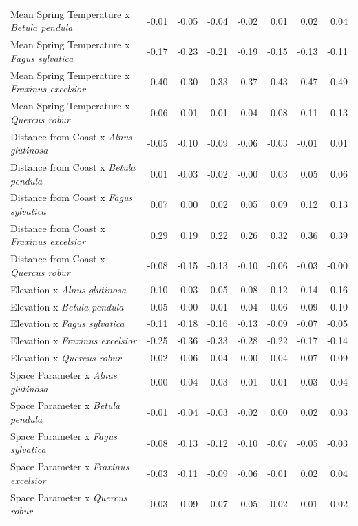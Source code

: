 \documentclass{article}\usepackage[]{graphicx}\usepackage[]{color}
\begin{document}
\begin{longtable}{lrrrrrrr}
  Mean Spring 
Temperature
x\textit{ Betula pendula} & -0.01 & -0.05 & -0.04 & -0.02 & 0.01 & 0.02 & 0.04 \\ 
  Mean Spring 
Temperature
x\textit{ Fagus sylvatica} & -0.17 & -0.23 & -0.21 & -0.19 & -0.15 & -0.13 & -0.11 \\ 
  Mean Spring 
Temperature
x\textit{ Fraxinus excelsior} & 0.40 & 0.30 & 0.33 & 0.37 & 0.43 & 0.47 & 0.49 \\ 
  Mean Spring 
Temperature
x\textit{ Quercus robur} & 0.06 & -0.01 & 0.01 & 0.04 & 0.08 & 0.11 & 0.13 \\ 
  Distance from 
Coast
x\textit{ Alnus glutinosa} & -0.05 & -0.10 & -0.09 & -0.06 & -0.03 & -0.01 & 0.01 \\ 
  Distance from 
Coast
x\textit{ Betula pendula} & 0.01 & -0.03 & -0.02 & -0.00 & 0.03 & 0.05 & 0.06 \\ 
  Distance from 
Coast
x\textit{ Fagus sylvatica} & 0.07 & 0.00 & 0.02 & 0.05 & 0.09 & 0.12 & 0.13 \\ 
  Distance from 
Coast
x\textit{ Fraxinus excelsior} & 0.29 & 0.19 & 0.22 & 0.26 & 0.32 & 0.36 & 0.39 \\ 
  Distance from 
Coast
x\textit{ Quercus robur} & -0.08 & -0.15 & -0.13 & -0.10 & -0.06 & -0.03 & -0.00 \\ 
  Elevation
x\textit{ Alnus glutinosa} & 0.10 & 0.03 & 0.05 & 0.08 & 0.12 & 0.14 & 0.16 \\ 
  Elevation
x\textit{ Betula pendula} & 0.05 & 0.00 & 0.01 & 0.04 & 0.06 & 0.09 & 0.10 \\ 
  Elevation
x\textit{ Fagus sylvatica} & -0.11 & -0.18 & -0.16 & -0.13 & -0.09 & -0.07 & -0.05 \\ 
  Elevation
x\textit{ Fraxinus excelsior} & -0.25 & -0.36 & -0.33 & -0.28 & -0.22 & -0.17 & -0.14 \\ 
  Elevation
x\textit{ Quercus robur} & 0.02 & -0.06 & -0.04 & -0.00 & 0.04 & 0.07 & 0.09 \\ 
  Space Parameter
x\textit{ Alnus glutinosa} & 0.00 & -0.04 & -0.03 & -0.01 & 0.01 & 0.03 & 0.04 \\ 
  Space Parameter
x\textit{ Betula pendula} & -0.01 & -0.04 & -0.03 & -0.02 & 0.00 & 0.02 & 0.03 \\ 
  Space Parameter
x\textit{ Fagus sylvatica} & -0.08 & -0.13 & -0.12 & -0.10 & -0.07 & -0.05 & -0.03 \\ 
  Space Parameter
x\textit{ Fraxinus excelsior} & -0.03 & -0.11 & -0.09 & -0.06 & -0.01 & 0.02 & 0.04 \\ 
  Space Parameter
x\textit{ Quercus robur} & -0.03 & -0.09 & -0.07 & -0.05 & -0.02 & 0.01 & 0.02 \\ 

\end{longtable}
\end{document}
